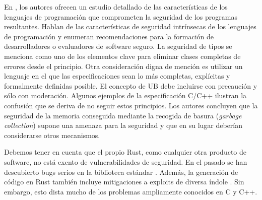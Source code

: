 En \cite{jaeger2014mind}, los autores ofrecen un estudio detallado de las características de
los lenguajes de programación que comprometen la seguridad de los programas resultantes.
Hablan de las características de seguridad intrínsecas de los lenguajes de programación y
enumeran recomendaciones para la formación de desarrolladores o evaluadores de software
seguro. La seguridad de tipos se menciona como uno de los elementos clave para eliminar
clases completas de errores desde el principio. Otra consideración digna de mención es utilizar
un lenguaje en el que las especificaciones sean lo más completas, explícitas y formalmente
definidas posible. El concepto de \acrfull{UB} debe incluirse con
precaución y sólo con moderación. Algunos ejemplos de la especificación C/C++ ilustran la
confusión que se deriva de no seguir estos principios. Los autores concluyen que la
seguridad de la memoria conseguida mediante la recogida de basura (\textit{garbage collection})
supone una amenaza para la seguridad y que en su lugar deberían considerarse otros mecanismos.

Debemos tener en cuenta que el propio Rust, como cualquier otra producto de software, no está
exento de vulnerabilidades de seguridad. En el pasado se han descubierto bugs serios en la
biblioteca estándar \cite{davidoff2018}. Además, la generación de código en Rust también incluye
mitigaciones a exploits de diversa índole \cite[Chap. 11]{rustc-book}. Sin embargo, esto
dista mucho de los problemas ampliamente conocidos en C y C++.